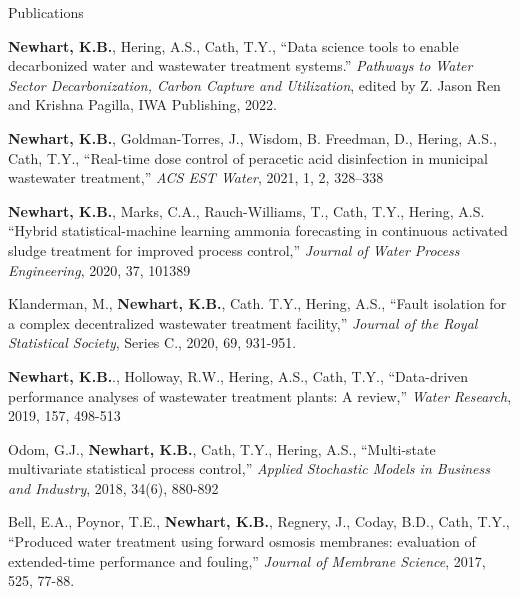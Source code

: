 \documentclass{resume} %
\begin{document}

\begin{rSection}{Publications}
\begin{etaremune}
	\item \textbf{Newhart, K.B.}, Hering, A.S., Cath, T.Y., ``Data science tools to enable decarbonized water and wastewater treatment systems.'' \emph{Pathways to Water Sector Decarbonization, Carbon Capture and Utilization}, edited by Z. Jason Ren and Krishna Pagilla, IWA Publishing, 2022.

	\item \textbf{Newhart, K.B.}, Goldman-Torres, J., Wisdom, B. Freedman, D., Hering, A.S., Cath, T.Y., ``Real-time dose control of peracetic acid disinfection in municipal wastewater treatment,'' \emph{ACS EST Water}, 2021, 1, 2, 328–338

	\item \textbf{Newhart, K.B.}, Marks, C.A., Rauch-Williams, T., Cath, T.Y., Hering, A.S. ``Hybrid statistical-machine learning ammonia forecasting in continuous activated sludge treatment for improved process control,'' \emph{Journal of Water Process Engineering}, 2020, 37, 101389

	\item Klanderman, M., \textbf{Newhart, K.B.}, Cath. T.Y., Hering, A.S., ``Fault isolation for a complex decentralized wastewater treatment facility,'' \emph{Journal of the Royal Statistical Society}, Series C., 2020, 69, 931-951.

	\item \textbf{Newhart, K.B.}., Holloway, R.W., Hering, A.S., Cath, T.Y., ``Data-driven performance analyses of wastewater treatment plants: A review,'' \emph{Water Research}, 2019, 157, 498-513

	\item Odom, G.J., \textbf{Newhart, K.B.}, Cath, T.Y., Hering, A.S., ``Multi-state multivariate statistical process control,'' \emph{Applied Stochastic Models in Business and Industry}, 2018, 34(6), 880-892

	\item Bell, E.A., Poynor, T.E., \textbf{Newhart, K.B.}, Regnery, J., Coday, B.D., Cath, T.Y., ``Produced water treatment using forward osmosis membranes: evaluation of extended-time performance and fouling,'' \emph{Journal of Membrane Science}, 2017, 525, 77-88.
\end{etaremune}

\end{rSection}
\end{document}
